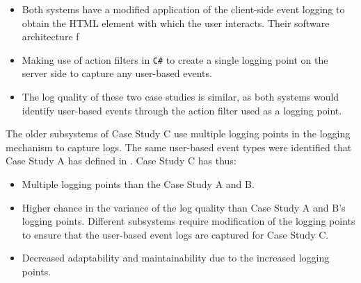 \begin{itemize}
	\item Both systems have a modified application of the  client-side event logging to obtain the HTML element with which the user interacts. Their software architecture f
	\item Making use of action filters in \texttt{C\#} to create a single logging point on the server side to capture any user-based events. 
	\item The log quality of these two case studies is similar, as both systems would identify user-based events through the action filter used as a logging point.
\end{itemize}

The older subsystems of Case Study C use multiple logging points in the logging mechanism to capture logs. The same user-based event types were identified that Case Study A has defined in . Case Study C has thus:

\begin{itemize}
	\item Multiple logging points than the Case Study A and B. 
	\item Higher chance in the variance of the log quality than Case Study A and B's logging points. Different subsystems require modification of the logging points to ensure that the user-based event logs are captured for Case Study C.
	\item Decreased adaptability and maintainability due to the increased logging points.
\end{itemize}

